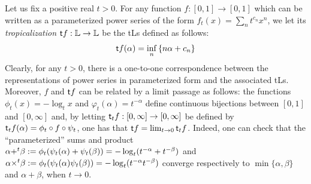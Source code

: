 Let us fix a positive real $t>0$. For any function $f:[0,1]\to [0,1]$ which can be written as a parameterized {power series} of the form $f_{t}(x)= \sum_{n}t^{c_{n}}x^{n}$, 
  we let its \emph{tropicalization} $\mathsf{t} f: \mathbb{L} \to \mathbb{L}$ be the tLs defined as follows:
\begin{align}\label{eq:defTLS}
\trop f(\alpha) =\inf_{n}\left\{ n\alpha+c_{n}\right\}
\end{align}
Clearly, for any $t>0$, there is a one-to-one correspondence between the representations of power series in parameterized form and the associated tLs. Moreover, 
$f$ and $\mathsf{t} f$ can be related by a limit passage as follows: the functions $\phi_{t}(x)= -\log_{t}x$ and $\varphi_{t}(\alpha)= t^{-\alpha}$ define continuous bijections between $[0,1]$ and $[0,\infty]$ and, by letting
$\mathsf{t} _{t}f: [0,\infty]\to [0,\infty]$ be defined by 
$\mathsf{t} _{t}f(\alpha)= \phi_{t}\circ f \circ \psi_{t}$, one has that 
$\mathsf{t} f= \lim_{t\to 0}\mathsf{t} _{t}f$. 
Indeed, one can check that the ``parameterized'' sums and product $\alpha {+}^{t}\beta:= \phi_{t}(\psi_{t}(\alpha)+\psi_{t}(\beta))= -\log_{t}(t^{-\alpha}+t^{-\beta})$ and 
$\alpha {\times}^{t}\beta:= \phi_{t}( \psi_{t}(\alpha)\psi_{t}(\beta))=
-\log_{t}(t^{-\alpha}t^{-\beta})$ converge respectively to $\min\{\alpha,\beta\}$ and $\alpha+\beta$, when $t\to 0$.

